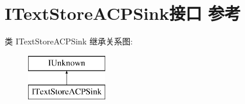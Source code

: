 \hypertarget{interface_i_text_store_a_c_p_sink}{}\section{I\+Text\+Store\+A\+C\+P\+Sink接口 参考}
\label{interface_i_text_store_a_c_p_sink}
类 I\+Text\+Store\+A\+C\+P\+Sink 继承关系图\+:\begin{figure}[H]
\begin{center}
\leavevmode
\includegraphics[height=2.000000cm]{interface_i_text_store_a_c_p_sink}
\end{center}
\end{figure}
